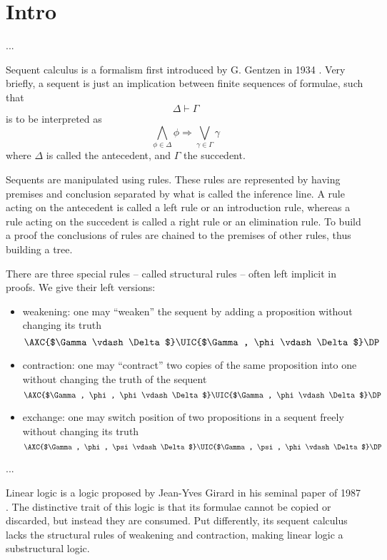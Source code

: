 \chapter{Intro}\label{chapter:intro}

... 

Sequent calculus is a formalism first introduced by G. Gentzen in 1934 \cite{Gentzen1935I, Gentzen1935II}.
Very briefly, a sequent is just an implication between finite sequences of formulae, such that
$$ \Delta \vdash \Gamma $$ 
is to be interpreted as
$$ \bigwedge_{\phi \in \Delta} \phi \Rightarrow \bigvee_{\gamma \in \Gamma} \gamma $$
where $\Delta$ is called the antecedent, and $\Gamma$ the succedent.

Sequents are manipulated using rules.
These rules are represented by having premises and conclusion separated by what is called the inference line.
A rule acting on the antecedent is called a left rule or an introduction rule, whereas a rule acting on the succedent is called a right rule or an elimination rule.
To build a proof the conclusions of rules are chained to the premises of other rules, thus building a tree.

There are three special rules -- called structural rules -- often left implicit in proofs.
We give their left versions:
\begin{itemize}
	\item weakening: one may ``weaken'' the sequent by adding a proposition without changing its truth
		$$
		\AXC{$\Gamma \vdash \Delta$}
		\UIC{$\Gamma, \phi \vdash \Delta$}
		\DP
		$$
	\item contraction: one may ``contract'' two copies of the same proposition into one without changing the truth of the sequent
		$$
		\AXC{$\Gamma, \phi, \phi \vdash \Delta$}
		\UIC{$\Gamma, \phi \vdash \Delta$}
		\DP
		$$
	\item exchange: one may switch position of two propositions in a sequent freely without changing its truth
		$$
		\AXC{$\Gamma, \phi, \psi \vdash \Delta$}
		\UIC{$\Gamma, \psi, \phi \vdash \Delta$}
		\DP
		$$
\end{itemize}

...

Linear logic is a logic proposed by Jean-Yves Girard in his seminal paper of 1987 \cite{LinearLogic}.
The distinctive trait of this logic is that its formulae cannot be copied or discarded, but instead they are consumed.
Put differently, its sequent calculus lacks the structural rules of weakening and contraction, making linear logic a substructural logic.

